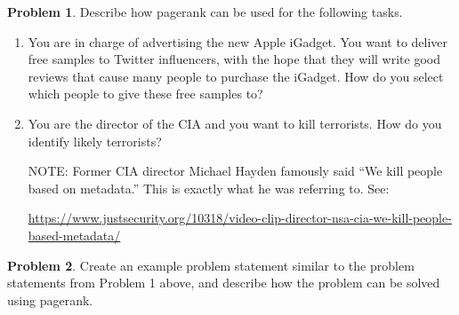 \documentclass[10pt]{exam}
\theoremstyle{definition}
\newtheorem{problem}{Problem}
\newcommand{\x}{\mathbf x}
\newcommand{\ltwo}[1]{{\lVert {#1} \rVert}_2}
\begin{document}
\begin{problem}
    Describe how pagerank can be used for the following tasks.
    \begin{enumerate}
        \item 
            You are in charge of advertising the new Apple iGadget.
            You want to deliver free samples to Twitter influencers,
            with the hope that they will write good reviews that cause many people to purchase the iGadget.
            How do you select which people to give these free samples to?
            \newpage
        \item 
            You are the director of the CIA and you want to kill terrorists.
            How do you identify likely terrorists?


            \vspace{8in}
            NOTE:
            Former CIA director Michael Hayden famously said ``We kill people based on metadata.''
            This is exactly what he was referring to.
            See:

            \url{https://www.justsecurity.org/10318/video-clip-director-nsa-cia-we-kill-people-based-metadata/}
    \end{enumerate}
\end{problem}

\newpage
\begin{problem}
    Create an example problem statement similar to the problem statements from Problem 1 above,
    and describe how the problem can be solved using pagerank.
\end{problem}


%
\end{document}
